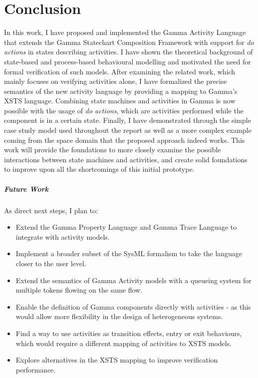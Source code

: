 \chapter{Conclusion}\label{ch:conclusion}

In this work, I have proposed and implemented the Gamma Activity Language that extends the Gamma Statechart Composition Framework with support for \emph{do actions} in states describing activities. I have shown the theoretical background of state-based and process-based behavioural modelling and motivated the need for formal verification of such models. After examining the related work, which mainly focuses on verifying activities alone, I have formalized the precise semantics of the new activity language by providing a mapping to Gamma's XSTS language. Combining state machines and activities in Gamma is now possible with the usage of \emph{do actions}, which are activities performed while the component is in a certain state. Finally, I have demonstrated through the simple case study model used throughout the report as well as a more complex example coming from the space domain that the proposed approach indeed works. This work will provide the foundations to more closely examine the possible interactions between state machines and activities, and create solid foundations to improve upon all the shortcomings of this initial prototype.

\paragraph{Future Work}

As direct next steps, I plan to:

\begin{itemize}
	\item Extend the Gamma Property Language and Gamma Trace Language to integrate with activity models.
	\item Implement a broader subset of the SysML formalism to take the language closer to the user level.
	\item Extend the semantics of Gamma Activity models with a queueing system for multiple tokens flowing on the same flow.
	\item Enable the definition of Gamma components directly with activities - as this would allow more flexibility in the design of heterogeneous systems.
	\item Find a way to use activities as transition effects, entry or exit behaviours, which would require a different mapping of activities to XSTS models.
	\item Explore alternatives in the XSTS mapping to improve verification performance.
\end{itemize}